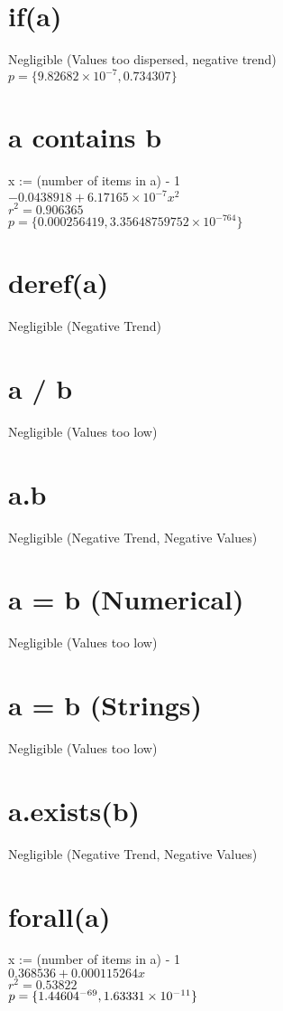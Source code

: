\documentclass[12pt]{article}
\begin{document}
	\section{if(a)}
	Negligible (Values too dispersed, negative trend)\\
	$p = \{9.82682 \times 10^{-7}, 0.734307\}$
	
	\section{a contains b}
	x := (number of items in a) - 1\\
	$-0.0438918 + 6.17165 \times 10^{-7} x^2$\\
	$r^2 = 0.906365$\\
	$p = \{0.000256419, 3.35648759752 \times 10^{-764}\}$
	
	\section{deref(a)}
	Negligible (Negative Trend)
	
	\section{a / b}
	Negligible (Values too low)
	
	\section{a.b}
	Negligible (Negative Trend, Negative Values)
	
	\section{a = b (Numerical)}
	Negligible (Values too low)
	
	\section{a = b (Strings)}
	Negligible (Values too low)
	
	\section{a.exists(b)}
	Negligible (Negative Trend, Negative Values)
	
	\section{forall(a)}
	x := (number of items in a) - 1\\
	$0.368536 + 0.000115264 x$\\
	$r^2 = 0.53822$\\
	$p = \{1.44604 \time 10^{-69}, 1.63331 \times 10^{-11}\}$
	
\end{document}
